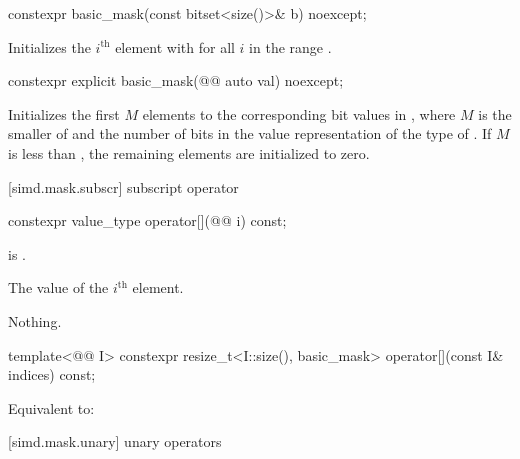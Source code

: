 \begin{itemdecl}
constexpr basic_mask(const bitset<size()>& b) noexcept;
\end{itemdecl}

\begin{itemdescr}
\pnum
\effects
Initializes the $i^\text{th}$ element with  for all $i$ in the
range .
\end{itemdescr}

\begin{itemdecl}
constexpr explicit basic_mask(@@ auto val) noexcept;
\end{itemdecl}

\begin{itemdescr}
\pnum
\effects
Initializes the first $M$ elements to the corresponding bit values in
, where $M$ is the smaller of  and the number of bits in
the value representation of the type of . If
$M$ is less than , the remaining elements are initialized to
zero.
\end{itemdescr}

[simd.mask.subscr]{ subscript operator}

\begin{itemdecl}
constexpr value_type operator[](@@ i) const;
\end{itemdecl}

\begin{itemdescr}
\pnum
\expects
{} is .

\pnum
\returns
The value of the $i^\text{th}$ element.

\pnum
\throws
Nothing.
\end{itemdescr}

\begin{itemdecl}
template<@@ I>
  constexpr resize_t<I::size(), basic_mask> operator[](const I& indices) const;
\end{itemdecl}

\begin{itemdescr}
\pnum
\effects
Equivalent to: 
\end{itemdescr}

[simd.mask.unary]{ unary operators}

